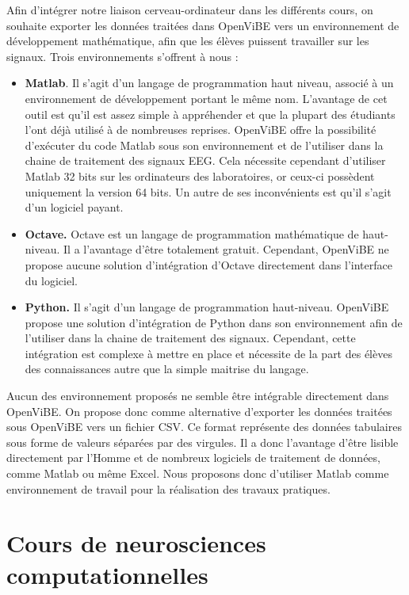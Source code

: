 Afin d'intégrer notre liaison cerveau-ordinateur dans les différents cours, on souhaite exporter les données traitées dans OpenViBE vers un environnement de développement mathématique, afin que les élèves puissent travailler sur les signaux. Trois environnements s'offrent à nous : 
\smallbreak
\begin{itemize}
	\item \textbf{Matlab}. Il s'agit d'un langage de programmation haut niveau, associé à un environnement de développement portant le même nom. L'avantage de cet outil est qu'il est assez simple à appréhender et que la plupart des étudiants l'ont déjà utilisé à de nombreuses reprises. OpenViBE offre la possibilité d'exécuter du code Matlab sous son environnement et de l'utiliser dans la chaine de traitement des signaux EEG. Cela nécessite cependant d'utiliser Matlab 32 bits sur les ordinateurs des laboratoires, or ceux-ci possèdent uniquement la version 64 bits. Un autre de ses inconvénients 
	est qu'il s'agit d'un logiciel payant.  
	\smallbreak
	\item \textbf{Octave.} Octave est un langage de programmation mathématique de haut-niveau. Il a l'avantage d'être totalement gratuit. Cependant, OpenViBE ne propose aucune solution d'intégration d'Octave directement dans l'interface du logiciel.
	\smallbreak
	\item \textbf{Python.} Il s'agit d'un langage de programmation haut-niveau. OpenViBE propose une solution d'intégration de Python dans son environnement afin de l'utiliser dans la chaine de traitement des signaux. Cependant, cette intégration est complexe à mettre en place et nécessite de la part des élèves des connaissances autre que la simple maitrise du langage. 
\end{itemize}
\smallbreak
Aucun des environnement proposés ne semble être intégrable directement dans OpenViBE. On propose donc comme alternative d'exporter les données traitées sous OpenViBE vers un fichier CSV. Ce format représente des données tabulaires sous forme de valeurs séparées par des virgules. Il a donc l'avantage d'être lisible directement par l'Homme et de nombreux logiciels de traitement de données, comme Matlab ou même Excel. Nous proposons donc d'utiliser Matlab comme environnement de travail pour la réalisation des travaux pratiques.

\section{Cours de neurosciences computationnelles}

